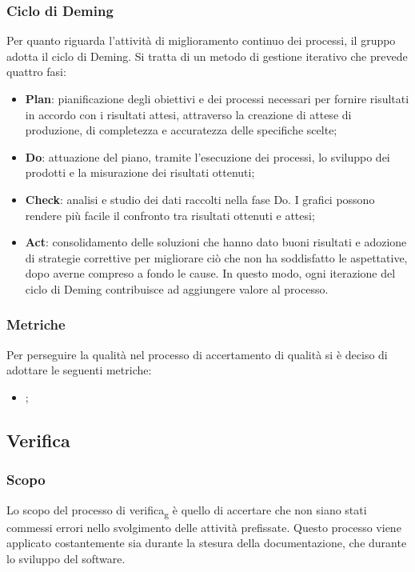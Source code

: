 \subsubsection{Ciclo di Deming}
Per quanto riguarda l'attività di miglioramento continuo dei processi, il
gruppo adotta il ciclo di Deming. Si tratta di un metodo di gestione iterativo
che prevede quattro fasi:
\begin{itemize}
    \item \textbf{Plan}: pianificazione degli obiettivi e dei processi necessari per fornire
          risultati in accordo con i risultati attesi, attraverso la creazione di attese di
          produzione, di completezza e accuratezza delle specifiche scelte;
    \item \textbf{Do}: attuazione del piano, tramite l'esecuzione dei processi,
          lo sviluppo dei prodotti e la misurazione dei risultati ottenuti;
    \item \textbf{Check}: analisi e studio dei dati raccolti nella fase Do.
          I grafici possono rendere più facile il confronto tra risultati ottenuti e attesi;
    \item \textbf{Act}: consolidamento delle soluzioni che hanno dato buoni risultati e
          adozione di strategie correttive per migliorare ciò che non ha soddisfatto le aspettative,
          dopo averne compreso a fondo le cause. In questo modo, ogni iterazione del ciclo di Deming
          contribuisce ad aggiungere valore al processo.
\end{itemize}
\subsubsection{Metriche}
Per perseguire la qualità nel processo di accertamento di qualità si è deciso
di adottare le seguenti metriche:
\begin{itemize}
    \item {};
\end{itemize}
\subsection{Verifica}
\subsubsection{Scopo}
Lo scopo del processo di verifica\textsubscript{g} è quello di accertare che
non siano stati commessi errori nello svolgimento delle attività prefissate.
Questo processo viene applicato costantemente sia durante la stesura della
documentazione, che durante lo sviluppo del software.
